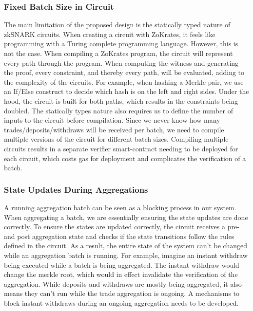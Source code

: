 \documentclass[../../thesis.tex]{subfiles}
\begin{document}
\subsubsection{Fixed Batch Size in Circuit}
The main limitation of the proposed design is the statically typed nature of zkSNARK circuits. When creating a circuit with ZoKrates, it feels like programming with a Turing complete programming language. However, this is not the case. When compiling a ZoKrates program, the circuit will represent every path through the program. When computing the witness and generating the proof, every constraint, and thereby every path, will be evaluated, adding to the complexity of the circuits. For example, when hashing a Merkle pair, we use an If/Else construct to decide which hash is on the left and right sides. Under the hood, the circuit is built for both paths, which results in the constraints being doubled. The statically types nature also requires us to define the number of inputs to the circuit before compilation. Since we never know how many trades/deposits/withdraws will be received per batch, we need to compile multiple versions of the circuit for different batch sizes. Compiling multiple circuits results in a separate verifier smart-contract needing to be deployed for each circuit, which costs gas for deployment and complicates the verification of a batch.

\subsubsection{State Updates During Aggregations}
A running aggregation batch can be seen as a blocking process in our system. When aggregating a batch, we are essentially ensuring the state updates are done correctly. To ensure the states are updated correctly, the circuit receives a pre- and post aggregation state and checks if the state transitions follow the rules defined in the circuit. As a result, the entire state of the system can't be changed while an aggregation batch is running. For example, imagine an instant withdraw being executed while a batch is being aggregated. The instant withdraw would change the merkle root, which would in effect invalidate the verification of the aggregation. While deposits and withdraws are mostly being aggregated, it also means they can't run while the trade aggregation is ongoing. A mechanisms to block instant withdraws during an ongoing aggregation needs to be developed. 
\end{document}
